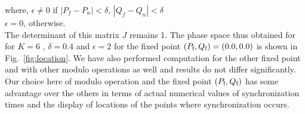 \documentclass[reprint,amsmath,amssymb,aps,pre]{revtex4-1}
\begin{document}
\vspace*{.2cm}

\noindent where, $ \epsilon \neq 0$ if $|P_f - P_n| < \delta$, $|Q_f - Q_n| < 
	\delta$\\ $\epsilon = 0$, otherwise.\\

The determinant of this matrix $J$ remains 1. The phase space thus obtained 
for for $K = 6$ , $\delta = 0.4$ and $\epsilon = 2$ for the fixed point 
$(P_\textnormal{f},Q_\textnormal{f})=(0.0,0.0)$ is shown in 
Fig.~\ref{fig:location}.   We have also 
performed computation for the other fixed point and with other modulo 
operations as well and results do not differ significantly. Our choice here of 
modulo operation and the fixed point $(P_\textnormal{f},Q_\textnormal{f})$ has 
some advantage over the 
others in terms of actual numerical values of synchronization times and the 
display of locations of the points where synchronization occurs. 
\end{document}
